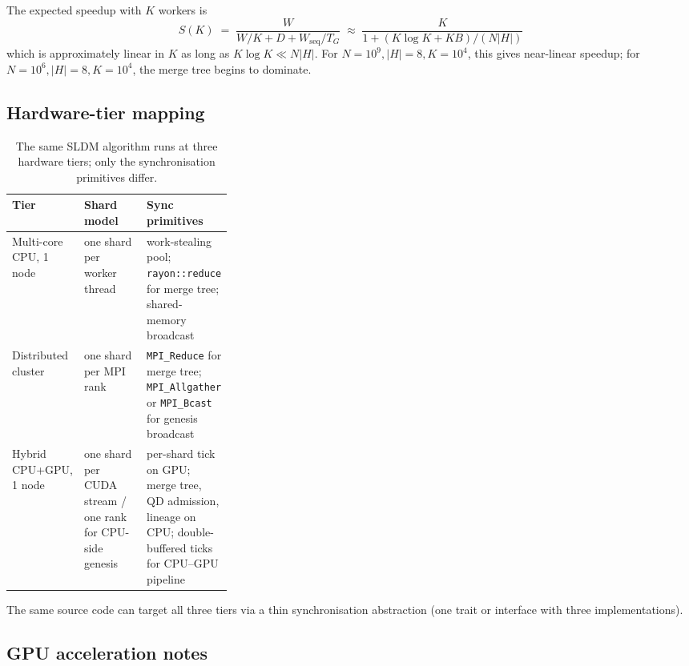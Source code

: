 \documentclass[journal,onecolumn,11pt]{IEEEtran}
\theoremstyle{definition}
\begin{document}
The expected speedup with $K$ workers is
\[
S(K) \;=\; \frac{W}{W/K + D + W_{\mathrm{seq}}/T_G}
\;\approx\; \frac{K}{1 + (K \log K + K B)/(N |H|)}
\]
which is approximately linear in $K$ as long as $K \log K \ll N|H|$. For $N = 10^9, |H| = 8, K = 10^4$, this gives near-linear speedup; for $N = 10^6, |H| = 8, K = 10^4$, the merge tree begins to dominate.

\subsection{Hardware-tier mapping}

\begin{table}[ht]
\centering
\caption{The same SLDM algorithm runs at three hardware tiers; only the synchronisation primitives differ.}
\label{tab:sldm-tiers}
\small
\begin{tabularx}{\linewidth}{l L{0.32\linewidth} Y}
\toprule
Tier & Shard model & Sync primitives \\
\midrule
Multi-core CPU, 1 node    & one shard per worker thread & work-stealing pool; \texttt{rayon::reduce} for merge tree; shared-memory broadcast \\
Distributed cluster       & one shard per MPI rank      & \texttt{MPI\_Reduce} for merge tree; \texttt{MPI\_Allgather} or \texttt{MPI\_Bcast} for genesis broadcast \\
Hybrid CPU+GPU, 1 node    & one shard per CUDA stream / one rank for CPU-side genesis & per-shard tick on GPU; merge tree, QD admission, lineage on CPU; double-buffered ticks for CPU--GPU pipeline \\
\bottomrule
\end{tabularx}
\end{table}

The same source code can target all three tiers via a thin synchronisation abstraction (one trait or interface with three implementations).

\subsection{GPU acceleration notes}
\end{document}
